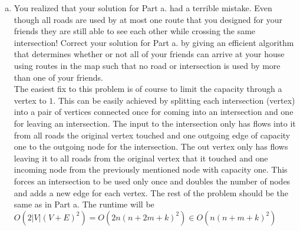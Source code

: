 \documentclass{article}
\begin{document}
\begin{enumerate}[a.]
\item You realized that your solution for Part a. had a terrible mistake.
Even though all roads are used by at most one route that you designed for your friends they are still able to see each other while crossing the same intersection!
Correct your solution for Part a. by giving an efficient algorithm that determines whether or not all of your friends can arrive at your house using routes in the map such that no road or intersection is used by more than one of your friends.\\
\newline
\indent The easiest fix to this problem is of course to limit the capacity through a vertex to $1$.
This can be easily achieved by splitting each intersection (vertex) into a pair of vertices connected once for coming into an intersection and one for leaving an intersection.
The input to the intersection only has flows into it from all roads the original vertex touched and one outgoing edge of capacity one to the outgoing node for the intersection.
The out vertex only has flows leaving it to all roads from the original vertex that it touched and one incoming node from the previously mentioned node with capacity one.
This forces an intersection to be used only once and doubles the number of nodes and adds a new edge for each vertex.
The rest of the problem should be the same as in Part a.
The runtime will be $O(2|V|(V+E)^2) = O(2n(n+2m+k)^2) \in O(n(n+m+k)^2) $
\end{enumerate}
\end{document}

